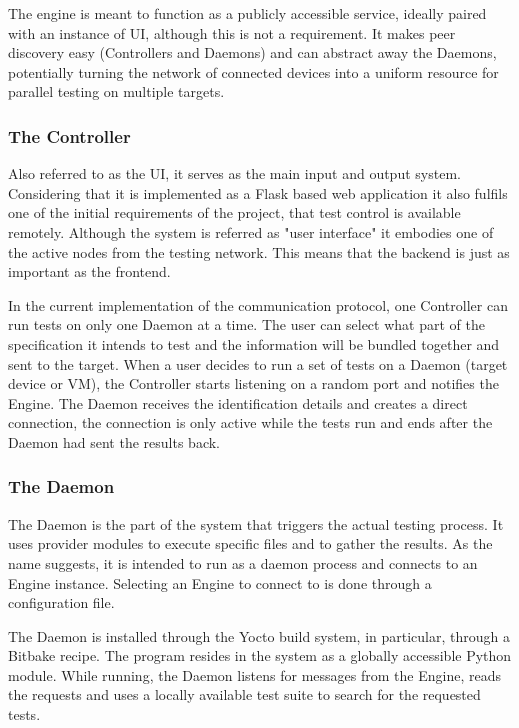 The engine is meant to function as a publicly accessible service, ideally paired with an instance of UI, although this is not a requirement. It makes peer discovery easy (Controllers and Daemons) and can abstract away the Daemons, potentially turning the network of connected devices into a uniform resource for parallel testing on multiple targets.

\subsubsection*{The Controller}
Also referred to as the UI, it serves as the main input and output system. Considering that it is implemented as a Flask based web application it also fulfils one of the initial requirements of the project, that test control is available remotely. Although the system is referred as "user interface" it embodies one of the active nodes from the testing network. This means that the backend is just as important as the frontend.

In the current implementation of the communication protocol, one Controller can run tests on only one Daemon at a time. The user can select what part of the specification it intends to test and the information will be bundled together and sent to the target. When a user decides to run a set of tests on a Daemon (target device or VM), the Controller starts listening on a random port and notifies the Engine. The Daemon receives the identification details and creates a direct connection, the connection is only active while the tests run and ends after the Daemon had sent the results back.

\subsubsection*{The Daemon}
The Daemon is the part of the system that triggers the actual testing process. It uses provider modules to execute specific files and to gather the results. As the name suggests, it is intended to run as a daemon process and connects to an Engine instance. Selecting an Engine to connect to is done through a configuration file.

The Daemon is installed through the Yocto build system, in particular, through a Bitbake recipe. The program resides in the system as a globally accessible Python module. While running, the Daemon listens for messages from the Engine, reads the requests and uses a locally available test suite to search for the requested tests. 

